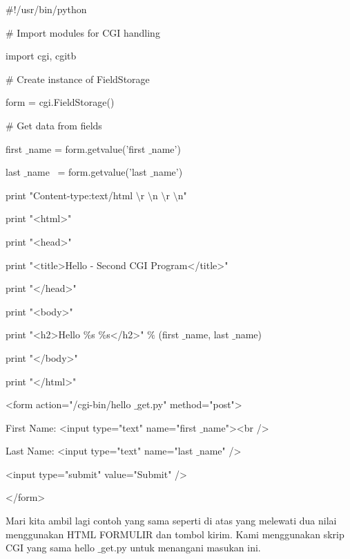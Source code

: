 \begin {enumerate}
\begin {enumerate}
 $  \#  $!/usr/bin/python \par
\vspace{12pt}
\noindent
 $  \#  $ Import modules for CGI handling  \par
\noindent
import cgi, cgitb  \par
\vspace{12pt}
\noindent
 $  \#  $ Create instance of FieldStorage  \par
\noindent
form = cgi.FieldStorage()  \par
\vspace{12pt}
\noindent
 $  \#  $ Get data from fields \par
\noindent
first $  \_  $name = form.getvalue('first $  \_  $name') \par
\noindent
last $  \_  $name~ = form.getvalue('last $  \_  $name') \par
\vspace{12pt}
\noindent
print "Content-type:text/html $  \setminus  $r $  \setminus  $n $  \setminus  $r $  \setminus  $n" \par
\noindent
print "<html>" \par
\noindent
print "<head>" \par
\noindent
print "<title>Hello - Second CGI Program</title>" \par
\noindent
print "</head>" \par
\noindent
print "<body>" \par
\noindent
print "<h2>Hello  $  \%  $s  $  \%  $s</h2>"  $  \%  $ (first $  \_  $name, last $  \_  $name) \par
\noindent
print "</body>" \par
\noindent
print "</html>" \par
\vspace{12pt}
\noindent
<form action="/cgi-bin/hello $  \_  $get.py" method="post"> \par
\noindent
First Name: <input type="text" name="first $  \_  $name"><br /> \par
\noindent
Last Name: <input type="text" name="last $  \_  $name" /> \par
\vspace{12pt}
\noindent
<input type="submit" value="Submit" /> \par
\noindent
</form> \par
\vspace{12pt}
Mari kita ambil lagi contoh yang sama seperti di atas yang melewati dua nilai menggunakan HTML FORMULIR dan tombol kirim. Kami menggunakan skrip CGI yang sama hello $  \_  $get.py untuk menangani masukan ini. \par

\end{enumerate}
\end{enumerate}
